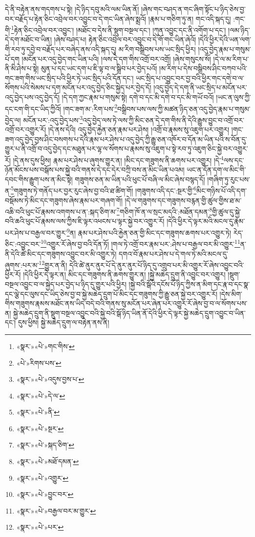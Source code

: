 དེ་ནི་བརྟེན་ནས་གདགས་པ་སྟེ། །དེ་ཉིད་དབུ་མའི་ལམ་ཡིན་ནོ། །ཞེས་གང་བཤད་ན་གང་ཞིག་སྟོང་པ་ཉིད་ཅེས་བྱ་བར་བརྗོད་པ་རྟེན་ཅིང་འབྲེལ་བར་འབྱུང་བ་དེ་གང་ཡིན་ཞེས་སྨྲའོ། །རྣམ་པ་གཅིག་ཏུ་ན། གང་འདི་སྐད་དུ། :གང་གི་\footnote{«སྣར་»«པེ་»གང་གིས་}རྟེན་ཅིང་འབྲེལ་བར་འབྱུང་། །མཐོང་བ་དེས་ནི་སྡུག་བསྔལ་དང་། །ཀུན་འབྱུང་དང་ནི་འགོག་པ་དང་། །ལམ་ཉིད་དེ་དག་མཐོང་བ་ཡིན། །ཞེས་བཤད་པ། རྟེན་ཅིང་འབྲེལ་བར་འབྱུང་བ་དེ་གོ་གང་ཡིན་ཞེའོ། །དེའི་ཕྱིར་དེའི་ཡན་ལག་གི་རབ་ཏུ་དབྱེ་བ་བརྗོད་པར་བཞེད་ནས་འདི་སྐད་དུ། མ་རིག་བསྒྲིབས་པས་ཡང་སྲིད་ཕྱིར། །འདུ་བྱེད་རྣམ་པ་གསུམ་པོ་དག །མངོན་པར་འདུ་བྱེད་གང་ཡིན་པའི། །ལས་དེ་དག་གིས་འགྲོ་བར་འགྲོ། །ཞེས་གསུངས་སོ། །དེ་ལ་མ་རིག་པ་ནི་མི་ཤེས་པ་སྟེ། མུན་པ་དང་ཡང་དག་པ་ཇི་ལྟ་བ་ལ་སྒྲིབ་པར་བྱེད་པའོ། །མ་རིག་པ་དེས་བསྒྲིབས་ཤིང་བཀབ་པའི་གང་ཟག་གིས་ཡང་སྲིད་པའི་ཕྱིར་ཏེ་ཡང་སྲིད་པའི་དོན་དང་། ཡང་སྲིད་པ་འབྱུང་བར་བྱ་བའི་ཕྱིར་གང་དགེ་བ་ལ་སོགས་པའི་སེམས་པ་དག་མངོན་པར་འདུ་བྱེད་ཅིང་སྐྱེད་པར་བྱེད་དོ། །འདུ་བྱེད་དེ་དག་ནི་ཡང་སྲིད་པ་མངོན་པར་འདུ་བྱེད་པས་འདུ་བྱེད་དོ། །དེ་དག་ཀྱང་རྣམ་པ་གསུམ་སྟེ། དགེ་བ་དང་མི་དགེ་བ་དང་མི་གཡོ་བའོ། །ཡང་ན་ལུས་ཀྱི་དང་ངག་གི་དང་ཡིད་ཀྱིའོ། །གང་ཟག་མ་:རིག་པས་\footnote{«པེ་»རིགས་པས་}བསྒྲིབས་པས་ལས་ཀྱི་མཚན་ཉིད་ཅན་འདུ་བྱེད་རྣམ་པ་གསུམ་བྱེད་ལ། མངོན་པར་:འདུ་བྱེད་པས་\footnote{«སྣར་»«པེ་»འདུས་བྱས་པ་}འདུ་བྱེད་ལས་ཏེ་ལས་ཀྱི་མིང་ཅན་དེ་དག་གིས་ནི་དེའི་རྒྱུས་བྱུང་བ་འགྲོ་བར་འགྲོ་བར་འགྱུར་རོ། །དེ་ནས་དེའི། འདུ་བྱེད་རྐྱེན་ཅན་རྣམ་པར་ཤེས། །འགྲོ་བ་རྣམས་སུ་འཇུག་པར་འགྱུར། །གང་ཟག་འདུ་བྱེད་བྱས་ཤིང་བསགས་པ་དེའི་རྣམ་པར་ཤེས་པ་འདུ་བྱེད་ཀྱི་རྒྱུ་ཅན་འཁོར་བ་དོན་མ་ཡིན་པའི་ས་བོན་དུ་གྱུར་པ་ནི་འགྲོ་བ་འདུ་བྱེད་དང་མཐུན་པར་ལྷ་ལ་སོགས་པ་རྣམས་སུ་འཇུག་པ་སྟེ་རབ་ཏུ་འཇུག་ཅིང་སྐྱེ་བར་འགྱུར་རོ། །དེ་ནས་དུས་ཕྱིས། རྣམ་པར་ཤེས་པ་ཞུགས་གྱུར་ན། །མིང་དང་གཟུགས་ནི་ཆགས་པར་འགྱུར། །དེ་\footnote{«སྣར་»«པེ་»དེ་ལ་}ལས་དང་ཉོན་མོངས་པས་བསྒོས་པས་སྐྱེ་བའི་གནས་དེ་དང་དེར་བཀྲི་བས་ན་མིང་ཡིན་པའམ། ཡང་ན་དོན་དག་ལ་མིང་གི་དབང་གིས་རྒྱུག་པས་ན་མིང་སྟེ། གཟུགས་ཅན་མ་ཡིན་པའི་ཕུང་པོ་བཞི་ལ་མིང་ཞེས་བསྙད་དོ། །གཞིག་ཏུ་རུང་པས་ན་\footnote{«སྣར་»«པེ་»ནི་}གཟུགས་ཏེ་གནོད་པར་བྱར་རུང་ཞེས་བྱ་བའི་ཐ་ཚིག་གོ། །གཟུགས་འདི་དང་:སྔར་གྱི་\footnote{«སྣར་»«པེ་»སྔར་}མིང་གཉིས་པོ་འདི་དག་བསྡོམས་ཏེ་མིང་དང་གཟུགས་ཞེས་རྣམ་པར་གཞག་གོ། །དེ་ལ་གཟུགས་དང་གཟུགས་བརྙན་གྱི་ཚུལ་གྱིས་ཐ་མ་འཆི་བའི་ཕུང་པོ་རྣམས་འགགས་པ་ན་:སྐད་ཅིག་མ་\footnote{«སྣར་»«པེ་»སྐད་ཅིག་}གཅིག་ཁོ་ན་ལ་སྲང་མདའི་:མཐོན་དམན་\footnote{«སྣར་»«པེ་»མཐོ་དམན་}གྱི་ཚུལ་དུ་སྐྱེ་བའི་ཆའི་ཕུང་པོ་རྣམས་ལས་ཀྱིས་ཇི་ལྟར་འཕངས་པ་ལྟར་སྐྱེ་བར་འགྱུར་རོ། །དེའི་ཕྱིར་དེ་ལྟར་མའི་མངལ་དུ་རྣམ་པར་ཤེས་པ་བརྒྱལ་བར་གྱུར་\footnote{«སྣར་»«པེ་»འགྱུར་}ན། རྣམ་པར་ཤེས་པའི་རྐྱེན་ཅན་གྱི་མིང་དང་གཟུགས་ཆགས་པར་འགྱུར་ཏེ། རེད་ཅིང་:འབྱུང་བར་\footnote{«སྣར་»«པེ་»བྱུང་བར་}འགྱུར་རོ་ཞེས་བྱ་བའི་དོན་ཏོ། །གལ་ཏེ་འགྲོ་བར་རྣམ་པར་:ཤེས་པ་བརྒྱལ་བར་མི་འགྱུར་\footnote{«སྣར་»«པེ་»བརྒྱལ་བར་མ་གྱུར་}ན་ནི་དེའི་ཚེ་མིང་དང་གཟུགས་འབྱུང་བར་མི་འགྱུར་ཏེ། དགའ་བོ་རྣམ་པར་ཤེས་པ་དེ་གལ་ཏེ་མའི་མངལ་དུ་ཞུགས་:པར་མ་\footnote{«སྣར་»«པེ་»པར་}གྱུར་ན་ནི། དེའི་ཚེ་ནུར་ནུར་པོ་དེ་ནུར་ནུར་པོ་ཉིད་དུ་འགྲུབ་པར་མི་འགྱུར་རོ་ཞེས་འབྱུང་བའི་ཕྱིར་རོ། །དེའི་ཕྱིར་དེ་ལྟར་ན། མིང་དང་གཟུགས་ནི་ཆགས་གྱུར་ན། །སྐྱེ་མཆེད་དྲུག་ནི་འབྱུང་བར་འགྱུར། །སྡུག་བསྔལ་འབྱུང་བ་ལ་སྐྱེད་པར་བྱེད་པ་ཉིད་དུ་གྱུར་པའི་ཕྱིར། །སྐྱེ་བའི་སྒོའི་དངོས་པོ་ཉིད་ཀྱིས་ན་མིག་དང་རྣ་བ་དང་སྣ་དང་ལྕེ་དང་ལུས་དང་ཡིད་ཅེས་བྱ་བ་སྐྱེ་མཆེད་དྲུག་པོ་མིང་དང་གཟུགས་ཀྱི་རྒྱུ་ཅན་སྐྱེ་བར་འགྱུར་རོ། །དེས་མིག་གིས་གཟུགས་རྣམས་མཐོང་ནས་ཡིད་བདེ་བའི་གནས་སུ་མངོན་པར་ཞེན་པར་འགྱུར་རོ་ཞེས་བྱ་བ་ལ་སོགས་པས་ན། སྐྱེ་མཆེད་དྲུག་ནི་སྡུག་བསྔལ་འབྱུང་བའི་སྐྱེ་བའི་སྒོ་ཉིད་ཡིན་ནོ་དེའི་ཕྱིར་དེ་ལྟར་སྐྱེ་མཆེད་དྲུག་འབྱུང་བ་ཡིན་དང་། དུས་ཕྱིས། སྐྱེ་མཆེད་དྲུག་ལ་བརྟེན་ནས་ནི། 